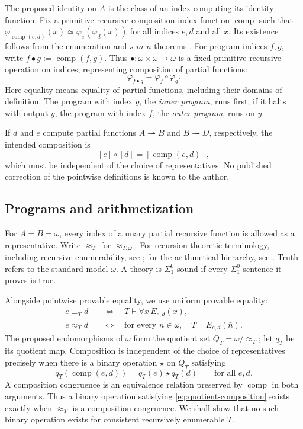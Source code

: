 \documentclass[11pt]{article}
\newcommand{\comp}{\operatorname{comp}}
\begin{document}
The proposed identity on $A$ is the class of an index computing its identity
function. Fix a primitive recursive composition-index function $\comp$ such
that $\varphi_{\comp(e,d)}(x)\simeq\varphi_e(\varphi_d(x))$ for all indices
$e,d$ and all $x$. Its existence follows from the enumeration and
$s$-$m$-$n$ theorems \cite[Theorem~II.1.5 and Proposition~II.1.7, pp.~130--131]{Odifreddi}.
For program indices $f,g$, write $f\bullet g:=\comp(f,g)$.
Thus $\bullet:\omega\times\omega\to\omega$ is a fixed primitive
recursive operation on indices, representing composition of partial
functions:
\[
 \varphi_{f\bullet g}=\varphi_f\circ\varphi_g.
\]
Here equality means equality of partial functions, including their domains
of definition. The program with index $g$, the \emph{inner program},
runs first; if it halts with output $y$, the program with index $f$,
the \emph{outer program}, runs on $y$.

If $d$ and $e$ compute partial functions
$A\rightharpoonup B$ and $B\rightharpoonup D$, respectively, the intended
composition is
\[
 [e]\circ[d]=[\comp(e,d)],
\]
which must be independent of the choice of representatives.
No published correction of the pointwise definitions is known to the author.

\subsection{Programs and arithmetization}\label{sec:arithmetization}

For $A=B=\omega$, every index of a unary partial recursive function is
allowed as a representative. Write $\approx_T$ for
$\approx_{T,\omega}$.
For recursion-theoretic terminology, including recursive enumerability,
see \cite{Rogers,Odifreddi}; for the arithmetical hierarchy, see
\cite[Definition~IV.1.6, p.~367]{Odifreddi}.
Truth refers to the standard model $\omega$.
A theory is $\Sigma^0_1$-sound if every $\Sigma^0_1$ sentence it proves
is true.

Alongside pointwise provable equality, we use uniform provable equality:
\begin{align}
 e\equiv_T d
 &\quad\Longleftrightarrow\quad T\vdash\forall x\,E_{e,d}(x),
 \label{eq:uniform}\\
 e\approx_T d
 &\quad\Longleftrightarrow\quad
 \text{for every }n\in\omega,\quad T\vdash E_{e,d}(\bar n).
 \label{eq:pointwise}
\end{align}
The proposed endomorphisms of $\omega$ form the quotient set
$Q_T=\omega/{\approx_T}$; let $q_T$ be its quotient map.
Composition is independent of the choice of representatives precisely
when there is a binary operation $\star$ on $Q_T$ satisfying
\begin{equation}\label{eq:quotient-composition}
 q_T(\comp(e,d))=q_T(e)\star q_T(d)
 \qquad\text{for all }e,d.
\end{equation}
A composition congruence is an equivalence relation preserved by
$\comp$ in both arguments. Thus a binary operation satisfying
\eqref{eq:quotient-composition} exists exactly when $\approx_T$ is a
composition congruence.
We shall show that no such binary operation exists for consistent
recursively enumerable $T$.
\end{document}
